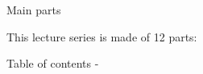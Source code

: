 %
%


\begin{frame}[t]{Main parts}

This lecture series is made of 12 parts:
\setcounter{tocdepth}{1}
\tableofcontents
\end{frame}


\begin{frame}[allowframebreaks,t]{Table of contents -}

\setcounter{tocdepth}{3}
\setcounter{secnumdepth}{2}
\tableofcontents

\end{frame}

